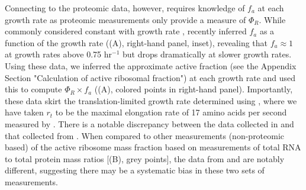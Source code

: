 Connecting  to the proteomic data, however, requires knowledge
of $f_a$ at each growth rate as proteomic measurements only provide a measure of
$\Phi_R$. While commonly considered constant with growth rate \citep{klumpp2013,
bosdriesz2015, kostinski2020}, \cite{dai2016} recently inferred $f_a$ as a
function of the growth rate ((A), right-hand panel, inset),
revealing that $f_a \approx 1$ at growth rates above 0.75 hr$^{-1}$ but drops
dramatically at slower growth rates. Using these data, we inferred the
approximate active fraction (see the Appendix Section "Calculation of active
ribosomal fraction") at each growth rate and used this to compute $\Phi_R \times
f_a$ ((A), colored points in right-hand panel). Importantly,
these data skirt the translation-limited growth rate determined using
, where we have taken $r_t$ to be the maximal elongation rate of
17 amino acids per second measured by \cite{dai2016}. There is a notable
discrepancy between the data collected in \cite{schmidt2016, li2014} and that
collected from \cite{valgepea2013, peebo2015}. When compared to other
measurements (non-proteomic based) of the active ribosome mass fraction based on
measurements of total RNA to total protein mass ratios [(B),
grey points], the data from
\cite{valgepea2013} and \cite{peebo2015} are notably different, suggesting there
may be a systematic bias in these two sets of measurements.


